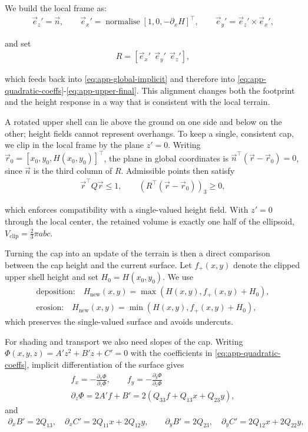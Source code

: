We build the local frame as:
\begin{align}
    \vec e_z'=\vec n,
    \qquad
    \vec e_x'=\operatorname{normalise} [1,0,-\partial_x H]^\top ,
    \qquad
    \vec e_y'=\vec e_z'\times \vec e_x',
\end{align}

and set
\begin{align}
    \label{eq:app-rotation-from-normal}
    R=[ \vec e_x'\ \ \vec e_y'\ \ \vec e_z' ],
\end{align}

which feeds back into \cref{eq:app-global-implicit} and therefore into \cref{eq:app-quadratic-coeffs}-\cref{eq:app-upper-final}. This alignment changes both the footprint and the height response in a way that is consistent with the local terrain.

A rotated upper shell can lie above the ground on one side and below on the other; height fields cannot represent overhangs. To keep a single, consistent cap, we clip in the local frame by the plane $z'=0$. Writing $\vec r_0=[x_0,y_0,H(x_0,y_0)]^\top $, the plane in global coordinates is $\vec n^\top (\vec r-\vec r_0)=0$, since $\vec n$ is the third column of $R$. Admissible points then satisfy
\begin{align}
    \vec r^\top Q\vec r \le 1,
    \qquad
    \left(R^\top (\vec r-\vec r_0)\right)_3 \ge 0,
\end{align}

which enforces compatibility with a single-valued height field. With $z'=0$ through the local center, the retained volume is exactly one half of the ellipsoid, $V_{\text{clip}}=\tfrac{2}{3}\pi abc$.

Turning the cap into an update of the terrain is then a direct comparison between the cap height and the current surface. Let $f_{+}(x,y)$ denote the clipped upper shell height and set $H_0=H(x_0,y_0)$. We use
\begin{align}
    \text{deposition:} \quad H_{\text{new}}(x,y)=\max\left(H(x,y), f_{+}(x,y)+H_0\right), \\
    \text{erosion:}\quad H_{\text{new}}(x,y)=\min\left(H(x,y), f_{+}(x,y)+H_0\right),
\end{align}
which preserves the single-valued surface and avoids undercuts.

For shading and transport we also need slopes of the cap. Writing $\Phi(x,y,z)=A'z^2+B'z+C'=0$ with the coefficients in \cref{eq:app-quadratic-coeffs}, implicit differentiation of the surface gives
\begin{align}
    f_x=-\frac{\partial_x\Phi}{\partial_z\Phi},
    \qquad
    f_y=-\frac{\partial_y\Phi}{\partial_z\Phi} \\
    \partial_z\Phi=2A' f + B' = 2\left(Q_{33} f + Q_{13}x + Q_{23}y\right),
\end{align}
and
\begin{align}
    \partial_x B'=2Q_{13},\quad
    \partial_x C'=2Q_{11}x+2Q_{12}y,
    \qquad
    \partial_y B'=2Q_{23},\quad
    \partial_y C'=2Q_{12}x+2Q_{22}y,
\end{align}

